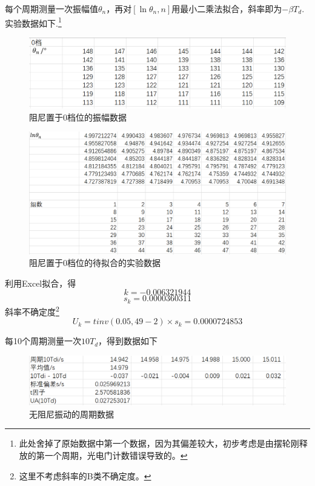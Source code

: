 \documentclass[a4paper,11pt]{article}
\begin{document}
        每个周期测量一次振幅值$\theta_n$，再对$[\ln\theta_n , n ]$用最小二乘法拟合，斜率即为$-\beta T_d$.实验数据如下.\footnote{此处舍掉了原始数据中第一个数据，因为其偏差较大，初步考虑是由摆轮刚释放的第一个周期，光电门计数错误导致的。}

        \begin{figure}[ht]
            \centering
            \includegraphics[scale=0.6]{无阻尼 角度数据.png}
            \caption{阻尼置于0档位的振幅数据}
        \end{figure}

        \begin{figure}[ht]
            \centering
            \includegraphics[scale=0.6]{无阻尼 拟合数据.png}
            \caption{阻尼置于0档位的待拟合的实验数据}
        \end{figure}

        利用Excel拟合，得
        $$
            k = -0.006321944
        $$
        $$
            s_k = 0.0000360311
        $$
        斜率不确定度\footnote{这里不考虑斜率的B类不确定度。}
        $$
            U_k = tinv(0.05, 49-2) \times s_k = 0.0000724853
        $$

        每10个周期测量一次$10T_d$，得到数据如下

        \begin{figure}[ht]
            \centering
            \includegraphics[scale=0.7]{无阻尼 周期.png}
            \caption{无阻尼振动的周期数据}
            \label{fig:label}
        \end{figure}
\end{document}
